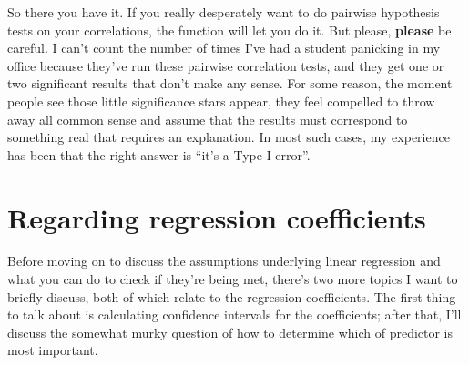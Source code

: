 So there you have it. If you really desperately want to do pairwise hypothesis tests on your correlations, the  function will let you do it. But please, {\bf please} be careful. I can't count the number of times I've had a student panicking in my office because they've run these pairwise correlation tests, and they get one or two significant results that don't make any sense. For some reason, the moment people see those little significance stars appear, they feel compelled to throw away all common sense and assume that the results must correspond to something real that requires an explanation. In most such cases, my experience has been that the right answer is ``it's a Type I error''. 

\section{Regarding regression coefficients~\label{sec:regressioncoefs}}

Before moving on to discuss the assumptions underlying linear regression and what you can do to check if they're being met, there's two more topics I want to briefly discuss, both of which relate to the regression coefficients. The first thing to talk about is calculating confidence intervals for the coefficients; after that, I'll discuss the somewhat murky question of how to determine which of predictor is most important.


